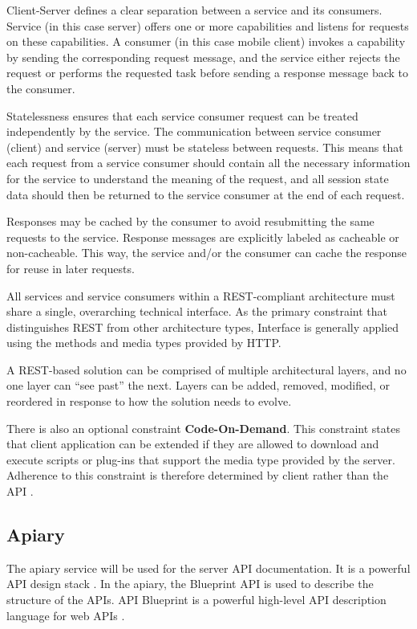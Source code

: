\begin{itemize}

Client-Server defines a clear separation between a service and its consumers. Service (in this case server) offers one
or more capabilities and listens for requests on these capabilities. A consumer (in this case mobile client) invokes a
capability by sending the corresponding request message, and the service either rejects the request or performs
the requested task before sending a response message back to the consumer.

Statelessness ensures that each service consumer request can be treated independently by the service. The communication
between service consumer (client) and service (server) must be stateless between requests. This means that each request
from a service consumer should contain all the necessary information for the service to understand the meaning of
the request, and all session state data should then be returned to the service consumer at the end of each request.

Responses may be cached by the consumer to avoid resubmitting the same requests to the service. Response messages  are
explicitly labeled as cacheable or non-cacheable. This way, the service and/or the consumer can cache the response for
reuse in later requests.

All services and service consumers within a REST-compliant architecture must share a single, overarching technical
interface. As the primary constraint that distinguishes REST from other architecture types, Interface is generally
applied using the methods and media types provided by HTTP.

A REST-based solution can be comprised of multiple architectural layers, and no one layer can ``see past'' the next.
Layers can be added, removed, modified, or reordered in response to how the solution needs to evolve.

\end{itemize}

There is also an optional constraint \textbf{Code-On-Demand}. This constraint states that client application can be
extended if they are allowed to download and execute scripts or plug-ins that support the media type provided by
the server. Adherence to this constraint is therefore determined by client rather than the API \cite{rest}.


\subsection{Apiary}
The apiary service will be used for the server API documentation. It is a powerful API design stack \cite{apiary}.
In the apiary, the Blueprint API is used to describe the structure of the APIs. API Blueprint is a powerful high-level
API description language for web APIs \cite{apiblueprint}.



